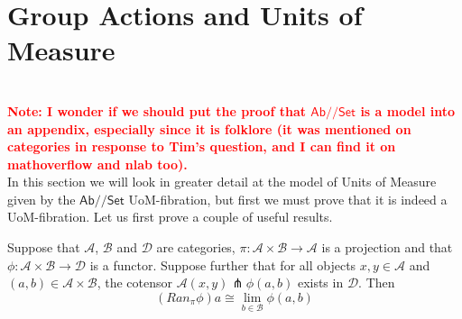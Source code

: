 \documentclass[a4paper,UKenglish]{lipics}
\newcommand\note[1]{{ \bf \textcolor{red} {\vspace{2mm}\; \\ Note: #1\\}}}
\newcommand{\UoM}{Units of Measure\xspace}
\newcommand{\ra}{\rightarrow}
\newcommand{\msf}[1]{\mathsf{#1}} %
\newcommand{\Ab}{\msf{Ab}}
\newcommand{\Set}{\msf{Set}}
\newcommand{\A}{\mathcal{A}}
\newcommand{\B}{\mathcal{B}}
\newcommand{\C}{\mathcal{C}}
\newcommand{\D}{\mathcal{D}}
\newcommand{\E}{\mathcal{E}}
\newcommand{\GroupSet}[1]{#1/\!/\Set}
\newcommand{\AbSet}{\GroupSet{\Ab}}
\newcommand{\UoMFibration}{UoM-fibration\xspace}
\begin{document}
%





\section{Group Actions and \UoM}
\note{I wonder if we should put the proof
that $\AbSet$ is a model into an appendix, especially since it
is folklore (it was mentioned on categories in response to Tim's question, and I can find it on mathoverflow and nlab too).
}
\label{sec:AbSet}
In this section we will look in greater detail at the model of \UoM given by the $\AbSet$ UoM-fibration, but first we must prove that it is indeed a \UoMFibration. Let us first prove a couple of useful results.


\begin{lemma}
\label{lemma:RanAlongPrj}
 Suppose that $\A$, $\B$ and $\D$ are categories, $\pi: \A \times \B \rightarrow \A$ is a projection and that $\phi:\A \times \B \rightarrow \mathcal{D}$ is a functor. Suppose further that for all objects $x,y \in \A$ and $(a,b)\in \A \times \B$, the cotensor $\A(x, y) \pitchfork \phi (a,b)$ exists in $\mathcal{D}$. Then
 \[
  (Ran_{\pi}\phi)a \cong \lim_{b\in \B} \phi (a,b)
 \]
\end{lemma}
\end{document}
